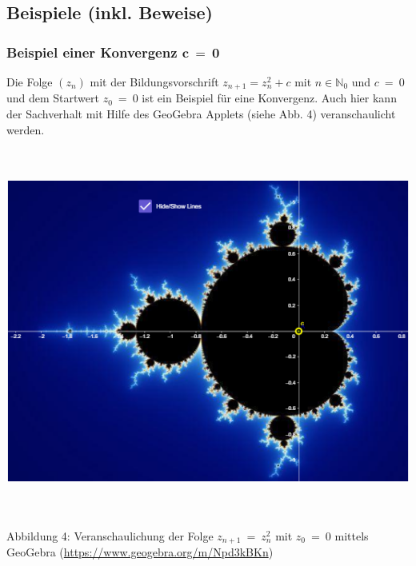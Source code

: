 \documentclass{book}
\begin{document}
\hypertarget{beispiele-inkl.-beweise}{%
\subsection{\texorpdfstring{Beispiele (inkl. Beweise)
}{Beispiele (inkl. Beweise) }}\label{beispiele-inkl.-beweise}}

\hypertarget{beispiel-einer-konvergenz-mathbfc-0}{%
\subsubsection{\texorpdfstring{Beispiel einer Konvergenz
\(\mathbf{c\  = \ 0}\)}{Beispiel einer Konvergenz \textbackslash mathbf\{c\textbackslash{}  = \textbackslash{} 0\}}}\label{beispiel-einer-konvergenz-mathbfc-0}}

Die Folge \(\left( z_{n} \right)\) mit der Bildungsvorschrift
\(z_{n + 1} = z_{n}^{2} + c\) mit \(n \in \mathbb{N}_{0}\) und
\(c\  = \ 0\) und dem Startwert \(z_{0}\  = \ 0\) ist ein Beispiel für
eine Konvergenz. Auch hier kann der Sachverhalt mit Hilfe des GeoGebra
Applets (siehe Abb. 4) veranschaulicht werden.

\includegraphics[width=6.33858in,height=4.74805in]{image9.png}

\protect\hypertarget{_Toc167901654}{}{}Abbildung 4: Veranschaulichung
der Folge \(z_{n + 1}\  = \ z_{n}^{2}\) mit \(z_{0}\  = \ 0\) mittels
GeoGebra (\url{https://www.geogebra.org/m/Npd3kBKn})
\end{document}
